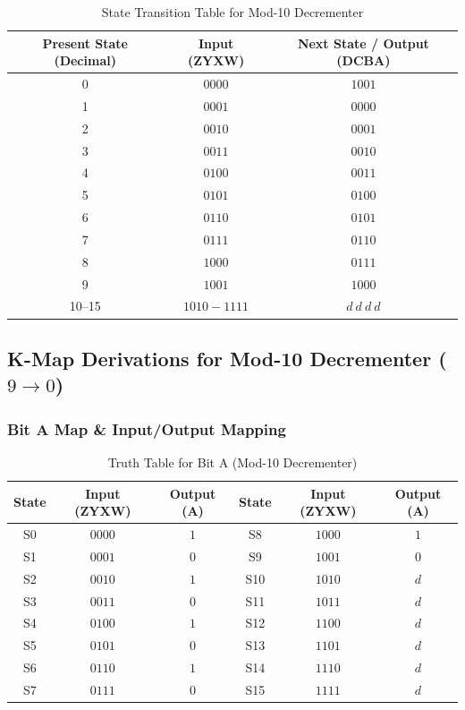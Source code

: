 \documentclass[journal,12pt,onecolumn]{IEEEtran}
\begin{document}
		\begin{table}[H]
			\centering
			\begin{tabular}{|c|c|c|}
				\hline
				\textbf{Present State (Decimal)} & \textbf{Input (ZYXW)} & \textbf{Next State / Output (DCBA)} \\
				\hline
				0 & $0000$ & $1001$ \\
				\hline
				1 & $0001$ & $0000$ \\
				\hline
				2 & $0010$ & $0001$ \\
				\hline
				3 & $0011$ & $0010$ \\
				\hline
				4 & $0100$ & $0011$ \\
				\hline
				5 & $0101$ & $0100$ \\
				\hline
				6 & $0110$ & $0101$ \\
				\hline
				7 & $0111$ & $0110$ \\
				\hline
				8 & $1000$ & $0111$ \\
				\hline
				9 & $1001$ & $1000$ \\
				\hline
				10--15 & $1010-1111$ & $d\ d\ d\ d$ \\
				\hline
			\end{tabular}
			\caption{State Transition Table for Mod-10 Decrementer}
		\end{table}
		
		\vspace{1em}
		\subsection{K-Map Derivations for Mod-10 Decrementer ($9 \rightarrow 0$)}
		
		\subsubsection{Bit A Map \& Input/Output Mapping}
		
		\begin{table}[H]
			\centering
			\begin{tabular}{|c|c|c||c|c|c|}
				\hline
				\textbf{State} & \textbf{Input (ZYXW)} & \textbf{Output (A)} & \textbf{State} & \textbf{Input (ZYXW)} & \textbf{Output (A)} \\
				\hline
				S0 & $0000$ & $1$ & S8 & $1000$ & $1$ \\
				\hline
				S1 & $0001$ & $0$ & S9 & $1001$ & $0$ \\
				\hline
				S2 & $0010$ & $1$ & S10 & $1010$ & $d$ \\
				\hline
				S3 & $0011$ & $0$ & S11 & $1011$ & $d$ \\
				\hline
				S4 & $0100$ & $1$ & S12 & $1100$ & $d$ \\
				\hline
				S5 & $0101$ & $0$ & S13 & $1101$ & $d$ \\
				\hline
				S6 & $0110$ & $1$ & S14 & $1110$ & $d$ \\
				\hline
				S7 & $0111$ & $0$ & S15 & $1111$ & $d$ \\
				\hline
			\end{tabular}
			\caption{Truth Table for Bit A (Mod-10 Decrementer)}
		\end{table}
		
\end{document}
